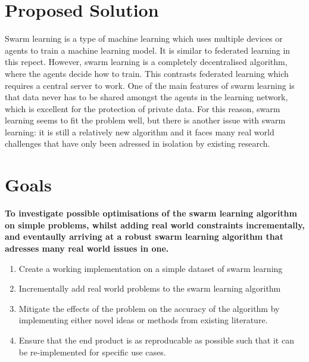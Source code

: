 \documentclass[12pt,a4paper,titlepage]{report}
\begin{document}
	\section{Proposed Solution}
	Swarm learning is a type of machine learning which uses multiple devices or agents to train a machine learning model. It is similar to federated learning in this repect. However, swarm learning is a completely decentralised algorithm, where the agents decide how to train. This contrasts federated learning which requires a central server to work. One of the main features of swarm learning is that data never has to be shared amongst the agents in the learning network, which is excellent for the protection of private data. For this reason, swarm learning seems to fit the problem well, but there is another issue with swarm learning: it is still a relatively new algorithm and it faces many real world challenges that have only been adressed in isolation by existing research.
	
	\section{Goals}
	\textbf{To investigate possible optimisations of the swarm learning algorithm on simple problems, whilst adding real world constraints incrementally, and eventaully arriving at a robust swarm learning algorithm that adresses many real world issues in one.}
	
	\begin{enumerate}
		\item Create a working implementation on a simple dataset of swarm learning
		\item Incrementally add real world problems to the swarm learning algorithm
		\item Mitigate the effects of the problem on the accuracy of the algorithm by implementing either novel ideas or methods from existing literature.
		\item Ensure that the end product is as reproducable as possible such that it can be re-implemented for specific use cases.
	\end{enumerate}
\end{document}
